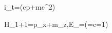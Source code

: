 i\hbar\partial_t\Psi=\left(c\vec{\alpha}\cdot\mathbf p+\beta mc^2\right)\Psi

H_{1+1}=p\sigma_x+m\sigma_z,\qquad E_\pm=\pm{}\quad(\hbar=c=1)

